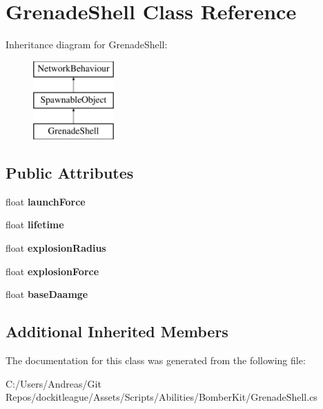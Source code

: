 \hypertarget{class_grenade_shell}{}\section{Grenade\+Shell Class Reference}
\label{class_grenade_shell}
Inheritance diagram for Grenade\+Shell\+:\begin{figure}[H]
\begin{center}
\leavevmode
\includegraphics[height=3.000000cm]{class_grenade_shell}
\end{center}
\end{figure}
\subsection*{Public Attributes}
\begin{DoxyCompactItemize}
\item 
\hypertarget{class_grenade_shell_a6544a1edb7d63d8038232337e65f01a3}{}\label{class_grenade_shell_a6544a1edb7d63d8038232337e65f01a3} 
float {\bfseries launch\+Force}
\item 
\hypertarget{class_grenade_shell_a6f912e86465988a7c89a277c7daf78d7}{}\label{class_grenade_shell_a6f912e86465988a7c89a277c7daf78d7} 
float {\bfseries lifetime}
\item 
\hypertarget{class_grenade_shell_ac63db10a5d44ca3f6ae082b1bfd73952}{}\label{class_grenade_shell_ac63db10a5d44ca3f6ae082b1bfd73952} 
float {\bfseries explosion\+Radius}
\item 
\hypertarget{class_grenade_shell_a9e62311ebd414c56f6b1ba1b3b79e034}{}\label{class_grenade_shell_a9e62311ebd414c56f6b1ba1b3b79e034} 
float {\bfseries explosion\+Force}
\item 
\hypertarget{class_grenade_shell_aade45e26055444ab2df944074a597cbf}{}\label{class_grenade_shell_aade45e26055444ab2df944074a597cbf} 
float {\bfseries base\+Daamge}
\end{DoxyCompactItemize}
\subsection*{Additional Inherited Members}


The documentation for this class was generated from the following file\+:\begin{DoxyCompactItemize}
\item 
C\+:/\+Users/\+Andreas/\+Git Repos/dockitleague/\+Assets/\+Scripts/\+Abilities/\+Bomber\+Kit/Grenade\+Shell.\+cs\end{DoxyCompactItemize}
